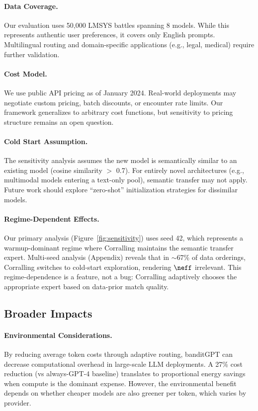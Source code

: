 \paragraph{Data Coverage.}
Our evaluation uses 50,000 LMSYS battles spanning 8 models. While this represents authentic user preferences, it covers only English prompts. Multilingual routing and domain-specific applications (e.g., legal, medical) require further validation.

\paragraph{Cost Model.}
We use public API pricing as of January 2024. Real-world deployments may negotiate custom pricing, batch discounts, or encounter rate limits. Our framework generalizes to arbitrary cost functions, but sensitivity to pricing structure remains an open question.

\paragraph{Cold Start Assumption.}
The sensitivity analysis assumes the new model is semantically similar to an existing model (cosine similarity $>$ 0.7). For entirely novel architectures (e.g., multimodal models entering a text-only pool), semantic transfer may not apply. Future work should explore ``zero-shot'' initialization strategies for dissimilar models.

\paragraph{Regime-Dependent Effects.}
Our primary analysis (Figure~\ref{fig:sensitivity}) uses seed 42, which represents a warmup-dominant regime where Corralling maintains the semantic transfer expert. Multi-seed analysis (Appendix) reveals that in $\sim$67\% of data orderings, Corralling switches to cold-start exploration, rendering $\neff$ irrelevant. This regime-dependence is a feature, not a bug: Corralling adaptively chooses the appropriate expert based on data-prior match quality.

\subsection{Broader Impacts}
\label{sec:broader_impacts}

\paragraph{Environmental Considerations.}
By reducing average token costs through adaptive routing, banditGPT can decrease computational overhead in large-scale LLM deployments. A 27\% cost reduction (vs always-GPT-4 baseline) translates to proportional energy savings when compute is the dominant expense. However, the environmental benefit depends on whether cheaper models are also greener per token, which varies by provider.

